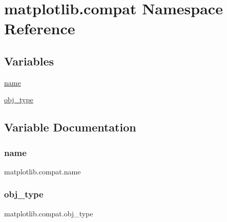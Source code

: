 \hypertarget{namespacematplotlib_1_1compat}{}\section{matplotlib.\+compat Namespace Reference}
\label{namespacematplotlib_1_1compat}
\subsection*{Variables}
\begin{DoxyCompactItemize}
\item 
\hyperlink{namespacematplotlib_1_1compat_a5255471ef6c2a11babf3388e41338807}{name}
\item 
\hyperlink{namespacematplotlib_1_1compat_a369743ca5a3991b7eb10d8f57f0dc0d8}{obj\+\_\+type}
\end{DoxyCompactItemize}


\subsection{Variable Documentation}
\mbox{\label{namespacematplotlib_1_1compat_a5255471ef6c2a11babf3388e41338807}} 
\subsubsection{\texorpdfstring{name}{name}}
{\footnotesize\ttfamily matplotlib.\+compat.\+name}

\mbox{\label{namespacematplotlib_1_1compat_a369743ca5a3991b7eb10d8f57f0dc0d8}} 
\subsubsection{\texorpdfstring{obj\+\_\+type}{obj\_type}}
{\footnotesize\ttfamily matplotlib.\+compat.\+obj\+\_\+type}

